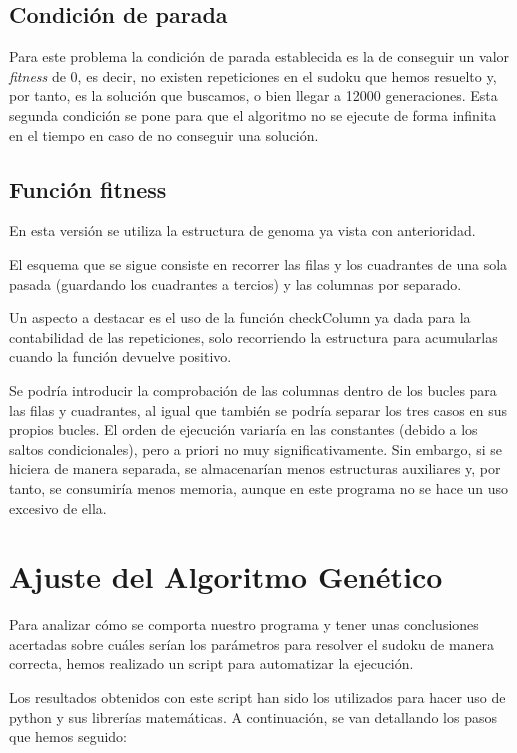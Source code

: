\documentclass[a4,11pt]{article}
\begin{document}
\subsection{Condición de parada}\label{des:parada}

Para este problema la condición de parada establecida es la de conseguir un valor \emph{fitness} de 0, es decir, no existen repeticiones en el sudoku que hemos resuelto y, por tanto, es la solución que buscamos, o bien llegar a 12000 generaciones. Esta segunda condición se pone para que el algoritmo no se ejecute de forma infinita en el tiempo en caso de no conseguir una solución.

\subsection{Función fitness}\label{des:fitness}

	En esta versión se utiliza la estructura de genoma ya vista con anterioridad.

	El esquema que se sigue consiste en recorrer las filas y los cuadrantes de una sola pasada (guardando los cuadrantes a tercios) y las columnas por separado.

	Un aspecto a destacar es el uso de la función checkColumn ya dada para la contabilidad de las repeticiones, solo recorriendo la estructura para acumularlas cuando la función devuelve positivo.

	Se podría introducir la comprobación de las columnas dentro de los bucles para las filas y cuadrantes, al igual que también se podría separar los tres casos en sus propios bucles. El orden de ejecución variaría en las constantes (debido a los saltos condicionales), pero a priori no muy significativamente. Sin embargo, si se hiciera de manera separada, se  almacenarían menos estructuras auxiliares y, por tanto, se consumiría menos memoria, aunque en este programa no se hace un uso excesivo de ella.

\newpage

\section{Ajuste del Algoritmo Genético}\label{label}

Para analizar cómo se comporta nuestro programa y tener unas conclusiones acertadas sobre cuáles serían los parámetros para resolver el sudoku de manera correcta, hemos realizado un script para automatizar la ejecución.

Los resultados obtenidos con este script han sido los utilizados para hacer uso de python y sus librerías matemáticas. A continuación, se van detallando los pasos que hemos seguido:
\end{document}
